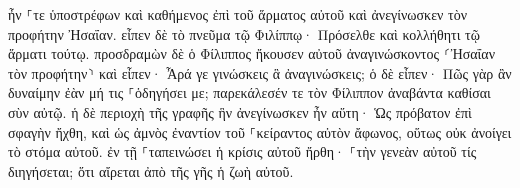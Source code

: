\documentclass{openreader}
\begin{document}
ἦν ⸀τε ὑποστρέφων καὶ καθήμενος ἐπὶ τοῦ ἅρματος αὐτοῦ καὶ ἀνεγίνωσκεν τὸν προφήτην Ἠσαΐαν. 
εἶπεν δὲ τὸ πνεῦμα τῷ Φιλίππῳ· Πρόσελθε καὶ κολλήθητι τῷ ἅρματι τούτῳ. 
προσδραμὼν δὲ ὁ Φίλιππος ἤκουσεν αὐτοῦ ἀναγινώσκοντος ⸂Ἠσαΐαν τὸν προφήτην⸃ καὶ εἶπεν· Ἆρά γε γινώσκεις ἃ ἀναγινώσκεις; 
ὁ δὲ εἶπεν· Πῶς γὰρ ἂν δυναίμην ἐὰν μή τις ⸀ὁδηγήσει με; παρεκάλεσέν τε τὸν Φίλιππον ἀναβάντα καθίσαι σὺν αὐτῷ. 
ἡ δὲ περιοχὴ τῆς γραφῆς ἣν ἀνεγίνωσκεν ἦν αὕτη· Ὡς πρόβατον ἐπὶ σφαγὴν ἤχθη, καὶ ὡς ἀμνὸς ἐναντίον τοῦ ⸀κείραντος αὐτὸν ἄφωνος, οὕτως οὐκ ἀνοίγει τὸ στόμα αὐτοῦ. 
ἐν τῇ ⸀ταπεινώσει ἡ κρίσις αὐτοῦ ἤρθη· ⸀τὴν γενεὰν αὐτοῦ τίς διηγήσεται; ὅτι αἴρεται ἀπὸ τῆς γῆς ἡ ζωὴ αὐτοῦ. 
\end{document}
